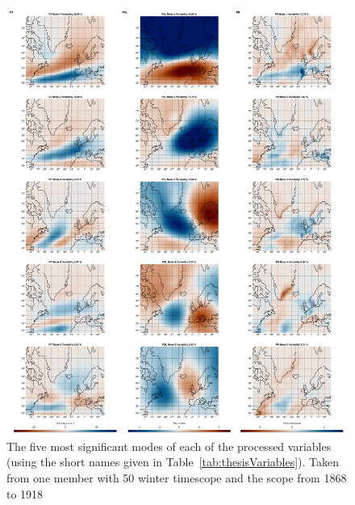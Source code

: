 \begin{figure}[!htb]
  \begin{center}
    \includegraphics[width=\textwidth]{figures/spatial_modes_overview.png}
\end{center}
  \caption[Example of Top 5 EOF Spatial Patterns for PSL, IVT and PR]{The five most significant modes of each of the processed variables (using the short names given in Table~\ref{tab:thesisVariables}). Taken from one member with 50 winter timescope and the scope from 1868 to 1918}
  \label{fig:5modes each variable}
\end{figure}



